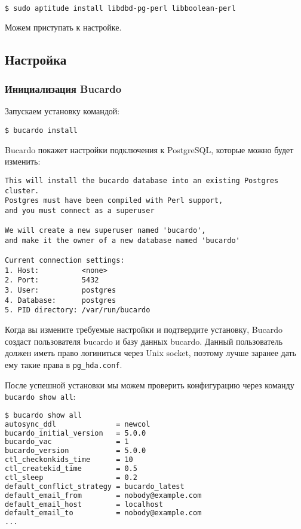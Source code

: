 \begin{lstlisting}[language=Bash,label=lst:bucardo-packet1,caption=Установка]
$ sudo aptitude install libdbd-pg-perl libboolean-perl
\end{lstlisting}

Можем приступать к настройке.

\subsection{Настройка}

\subsubsection{Инициализация Bucardo}

Запускаем установку командой:

\begin{lstlisting}[label=lst:bucardo5,caption=Инициализация Bucardo]
$ bucardo install
\end{lstlisting}

Bucardo покажет настройки подключения к PostgreSQL, которые можно будет изменить:

\begin{lstlisting}[label=lst:bucardo6,caption=Инициализация Bucardo]
This will install the bucardo database into an existing Postgres cluster.
Postgres must have been compiled with Perl support,
and you must connect as a superuser

We will create a new superuser named 'bucardo',
and make it the owner of a new database named 'bucardo'

Current connection settings:
1. Host:          <none>
2. Port:          5432
3. User:          postgres
4. Database:      postgres
5. PID directory: /var/run/bucardo
\end{lstlisting}

Когда вы измените требуемые настройки и подтвердите установку, Bucardo создаст пользователя bucardo и базу данных bucardo.
Данный пользователь должен иметь право логиниться через Unix socket, поэтому лучше заранее дать ему такие права в \lstinline!pg_hda.conf!.

После успешной установки мы можем проверить конфигурацию через команду \lstinline!bucardo show all!:

\begin{lstlisting}[language=Bash,label=lst:bucardo-status1,caption=Инициализация Bucardo]
$ bucardo show all
autosync_ddl              = newcol
bucardo_initial_version   = 5.0.0
bucardo_vac               = 1
bucardo_version           = 5.0.0
ctl_checkonkids_time      = 10
ctl_createkid_time        = 0.5
ctl_sleep                 = 0.2
default_conflict_strategy = bucardo_latest
default_email_from        = nobody@example.com
default_email_host        = localhost
default_email_to          = nobody@example.com
...
\end{lstlisting}

